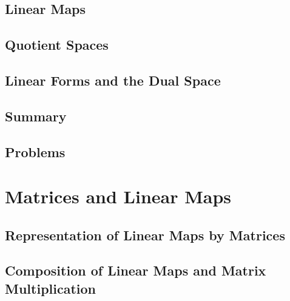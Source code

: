 \documentclass[a4paper]{article}
\begin{document}
\subsection{ Linear Maps} %

\subsection{ Quotient Spaces} %

\subsection{ Linear Forms and the Dual Space} %

\subsection{ Summary} %

\subsection{ Problems} %


\newpage
\section{Matrices and Linear Maps}
\subsection{ Representation of Linear Maps by Matrices} %

\subsection{ Composition of Linear Maps and Matrix Multiplication} %
\end{document}
